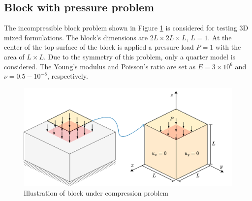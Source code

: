


\subsection{Block with pressure problem}
The incompressible block problem shown in Figure \ref{fg:block_model} is considered for testing 3D mixed formulations. The block's dimensions are $2L\times 2L \times L$, $L=1$.
At the center of the top surface of the block is applied a pressure load $P = 1$ with the area of $L\times L$.
Due to the symmetry of this problem, only a quarter model is considered.
The Young's modulus and Poisson's ratio are set as $E = 3\times 10^6$ and $\nu = 0.5-10^{-8}$, respectively.

\begin{figure}[H]
\centering
\includegraphics[width=\textwidth]{png/block.png}
\caption{Illustration of block under compression problem}\label{fg:block_model}
\end{figure}

